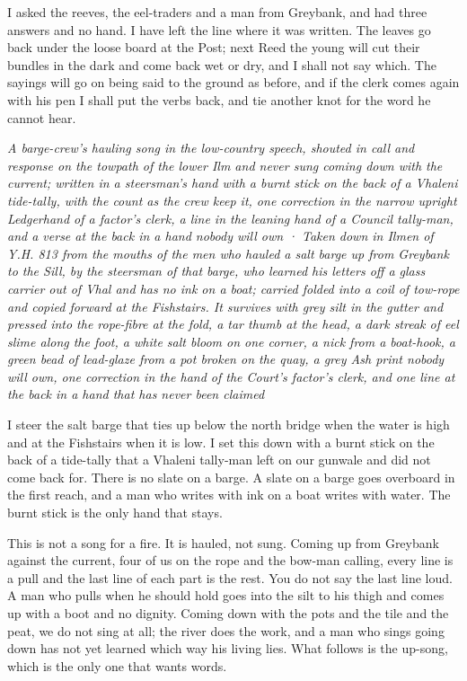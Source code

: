 \documentclass{design/chronicle}
\begin{document}
I asked the reeves, the eel-traders and a man from Greybank, and had three answers and no hand. I have left the line where it was written. The leaves go back under the loose board at the Post; next Reed the young will cut their bundles in the dark and come back wet or dry, and I shall not say which. The sayings will go on being said to the ground as before, and if the clerk comes again with his pen I shall put the verbs back, and tie another knot for the word he cannot hear.

\clearpage{}
{\centering\FellFont\itshape\footnotesize\color{faded} A barge-crew’s hauling song in the low-country speech, shouted in call and response on the towpath of the lower Ilm and never sung coming down with the current; written in a steersman’s hand with a burnt stick on the back of a Vhaleni tide-tally, with the count as the crew keep it, one correction in the narrow upright Ledgerhand of a factor’s clerk, a line in the leaning hand of a Council tally-man, and a verse at the back in a hand nobody will own · Taken down in Ilmen of Y.H. 813 from the mouths of the men who hauled a salt barge up from Greybank to the Sill, by the steersman of that barge, who learned his letters off a glass carrier out of Vhal and has no ink on a boat; carried folded into a coil of tow-rope and copied forward at the Fishstairs. It survives with grey silt in the gutter and pressed into the rope-fibre at the fold, a tar thumb at the head, a dark streak of eel slime along the foot, a white salt bloom on one corner, a nick from a boat-hook, a green bead of lead-glaze from a pot broken on the quay, a grey Ash print nobody will own, one correction in the hand of the Court’s factor’s clerk, and one line at the back in a hand that has never been claimed\par}\medskip
I steer the salt barge that ties up below the north bridge when the water is high and at the Fishstairs when it is low. I set this down with a burnt stick on the back of a tide-tally that a Vhaleni tally-man left on our gunwale and did not come back for. There is no slate on a barge. A slate on a barge goes overboard in the first reach, and a man who writes with ink on a boat writes with water. The burnt stick is the only hand that stays.

This is not a song for a fire. It is hauled, not sung. Coming up from Greybank against the current, four of us on the rope and the bow-man calling, every line is a pull and the last line of each part is the rest. You do not say the last line loud. A man who pulls when he should hold goes into the silt to his thigh and comes up with a boot and no dignity. Coming down with the pots and the tile and the peat, we do not sing at all; the river does the work, and a man who sings going down has not yet learned which way his living lies. What follows is the up-song, which is the only one that wants words.
\end{document}
